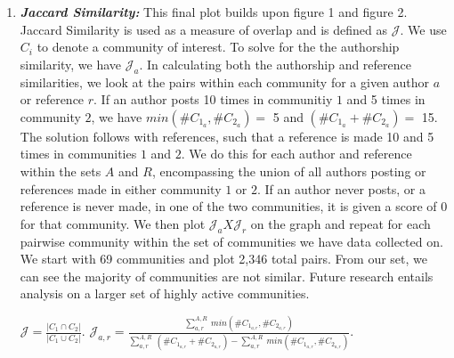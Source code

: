 \documentclass[b0paper,margin=1cm,landscape]{baposter}
\begin{document}
\begin{poster}
{\begin{enumerate}
    \vspace{1em}
    \item \textsl{\textbf{Jaccard Similarity:}}
    \subitem This final plot builds upon figure 1 and figure 2.
    Jaccard Similarity is used as a measure of overlap and is defined as $ \mathcal{J} $.
    We use $C_i$ to denote a community of interest.
    To solve for the the authorship similarity, we have $ \mathcal{J}_a $.
    In calculating both the authorship and reference similarities, we look at the pairs within each community for a given author $ a $ or reference $ r $.
    If an author posts 10 times in communitiy $ 1 $ and 5 times in community $ 2 $, we have $ min (\# C_{1_a}, \# C_{2_a}) = $ 5 and $ (\# C_{1_a} + \# C_{2_a}) =$ 15.
    The solution follows with references, such that a reference is made 10 and 5 times in communities $ 1 $ and $ 2 $.
    We do this for each author and reference within the sets $ A $ and $ R $, encompassing the union of all authors posting or references made in either community $1$ or $2$.
    If an author never posts, or a reference is never made, in one of the two communities, it is given a score of 0 for that community.
    We then plot $ \mathcal{J}_a X \mathcal{J}_r $ on the graph and repeat for each pairwise community within the set of communities we have data collected on.
    We start with 69 communities and plot 2,346 total pairs.
    From our set, we can see the majority of communities are not similar.
    Future research entails analysis on a larger set of highly active communities.
    \begin{center}
      $ \displaystyle \mathcal{J} = \frac{\vert C_1 \cap C_2 \vert }{\vert C_1 \cup C_2 \vert } $. \vspace{10mm}
      $ \displaystyle \mathcal{J}_{a,r} = \frac{\sum_{a,r}^{A,R} \ min (\# C_{1_{a,r}}, \# C_{2_{a,r}})}{\sum_{a,r}^{A,R} \ (\# C_{1_{a,r}} + \# C_{2_{a,r}}) - \sum_{a,r}^{A,R} \ min (\# C_{1_{a,r}}, \# C_{2_{a,r}})} $. \vspace{10mm}
    \end{center}

  \end{enumerate}

}

\end{poster}
\end{document}

